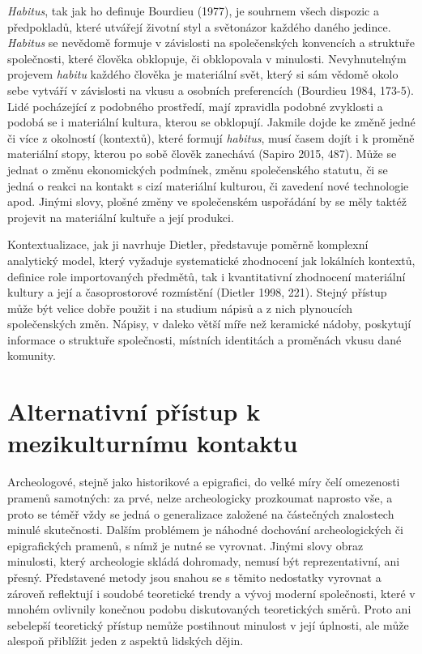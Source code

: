 {\em Habitus}, tak jak ho definuje Bourdieu (1977), je souhrnem všech dispozic a předpokladů, které utvářejí životní styl a světonázor každého daného jedince. {\em Habitus} se nevědomě formuje v závislosti na společenských konvencích a struktuře společnosti, které člověka obklopuje, či obklopovala v minulosti. Nevyhnutelným projevem {\em habitu} každého člověka je materiální svět, který si sám vědomě okolo sebe vytváří v závislosti na vkusu a osobních preferencích (Bourdieu 1984, 173-5). Lidé pocházející z podobného prostředí, mají zpravidla podobné zvyklosti a podobá se i materiální kultura, kterou se obklopují. Jakmile dojde ke změně jedné či více z okolností (kontextů), které formují {\em habitus}, musí časem dojít i k proměně materiální stopy, kterou po sobě člověk zanechává (Sapiro 2015, 487). Může se jednat o změnu ekonomických podmínek, změnu společenského statutu, či se jedná o reakci na kontakt s cizí materiální kulturou, či zavedení nové technologie apod. Jinými slovy, plošné změny ve společenském uspořádání by se měly taktéž projevit na materiální kultuře a její produkci.

Kontextualizace, jak ji navrhuje Dietler, představuje poměrně komplexní analytický model, který vyžaduje systematické zhodnocení jak lokálních kontextů, definice role importovaných předmětů, tak i kvantitativní zhodnocení materiální kultury a její a časoprostorové rozmístění (Dietler 1998, 221). Stejný přístup může být velice dobře použit i na studium nápisů a z nich plynoucích společenských změn. Nápisy, v daleko větší míře než keramické nádoby, poskytují informace o struktuře společnosti, místních identitách a proměnách vkusu dané komunity.

\section[alternativní-přístup-k-mezikulturnímu-kontaktu]{Alternativní přístup k mezikulturnímu kontaktu}

Archeologové, stejně jako historikové a epigrafici, do velké míry čelí omezenosti pramenů samotných: za prvé, nelze archeologicky prozkoumat naprosto vše, a proto se téměř vždy se jedná o generalizace založené na částečných znalostech minulé skutečnosti. Dalším problémem je náhodné dochování archeologických či epigrafických pramenů, s nímž je nutné se vyrovnat. Jinými slovy obraz minulosti, který archeologie skládá dohromady, nemusí být reprezentativní, ani přesný. Představené metody jsou snahou se s těmito nedostatky vyrovnat a zároveň reflektují i soudobé teoretické trendy a vývoj moderní společnosti, které v mnohém ovlivnily konečnou podobu diskutovaných teoretických směrů. Proto ani sebelepší teoretický přístup nemůže postihnout minulost v její úplnosti, ale může alespoň přiblížit jeden z aspektů lidských dějin.


